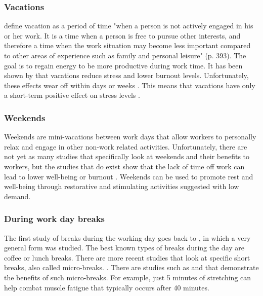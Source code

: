 \documentclass{hasel_thesis}
\begin{document}
\subsubsection{Vacations}
\cite{Lounsbury.1986} define vacation as a period of time "when a person is not actively engaged in his or her work. It is a time when a person is free to pursue other interests, and therefore a time when the work situation may become less important compared to other areas of experience such as family and personal leisure" (p. 393\cite{Lounsbury.1986}). The goal is to regain energy to be more productive during work time. It has been shown by \cite{Westman.2001} that vacations reduce stress and lower burnout levels. Unfortunately, these effects wear off within days or weeks \cite{Westman.2001}. This means that vacations have only a short-term positive effect on stress levels \cite{Fritz.2006}.


\subsubsection{Weekends}
Weekends are mini-vacations between work days that allow workers to personally relax and engage in other non-work related activities. Unfortunately, there are not yet as many studies that specifically look at weekends and their benefits to workers, but the studies that do exist show that the lack of time off work can lead to lower well-being or burnout \cite{Fritz.2005}. Weekends can be used to promote rest and well-being through restorative and stimulating activities suggested with low demand.

\subsubsection{During work day breaks}
The first study of breaks during the working day goes back to \cite{Mayo.1933}, in which a very general form was studied. The best known types of breaks during the day are coffee or lunch breaks. There are more recent studies that look at specific short breaks, also called micro-breaks. \cite{BennettAndrewA.GabrielAllisonS.CalderwoodCharles.2020}. There are studies such as \cite{BennettAndrewA.GabrielAllisonS.CalderwoodCharles.2020} and \cite{Ding.2020} that demonstrate the benefits of such micro-breaks. For example, just 5 minutes of stretching can help combat muscle fatigue that typically occurs after 40 minutes. 
\end{document}
